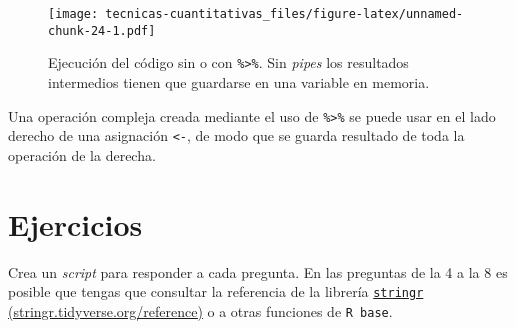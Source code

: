\documentclass[
]{book}
\newenvironment{Shaded}{\begin{snugshade}}{\end{snugshade}}
\newcommand{\DataTypeTok}[1]{\textcolor[rgb]{0.13,0.29,0.53}{#1}}
\newcommand{\DecValTok}[1]{\textcolor[rgb]{0.00,0.00,0.81}{#1}}
\newcommand{\KeywordTok}[1]{\textcolor[rgb]{0.13,0.29,0.53}{\textbf{#1}}}
\newcommand{\NormalTok}[1]{#1}
\newcommand{\OperatorTok}[1]{\textcolor[rgb]{0.81,0.36,0.00}{\textbf{#1}}}
\newcommand{\StringTok}[1]{\textcolor[rgb]{0.31,0.60,0.02}{#1}}
\begin{document}
\begin{figure}
\centering
\texttt{[image: tecnicas-cuantitativas\_files/figure-latex/unnamed-chunk-24-1.pdf]}
\caption{\label{fig:unnamed-chunk-24}Ejecución del código sin o con \texttt{\%\textgreater{}\%}. Sin \emph{pipes} los resultados intermedios tienen que guardarse en una variable en memoria.}
\end{figure}

Una operación compleja creada mediante el uso de \texttt{\%\textgreater{}\%} se puede usar en el lado derecho de una asignación \texttt{\textless{}-}, de modo que se guarda resultado de toda la operación de la derecha.

\begin{Shaded}
\end{Shaded}

\hypertarget{ejercicios}{%
\section{Ejercicios}\label{ejercicios}}

Crea un \emph{script} para responder a cada pregunta. En las preguntas de la 4 a la 8 es posible que tengas que consultar la referencia de la librería \href{https://stringr.tidyverse.org/reference/index.html}{\texttt{stringr} (stringr.tidyverse.org/reference)} o a otras funciones de \texttt{R\ base}.
\end{document}
